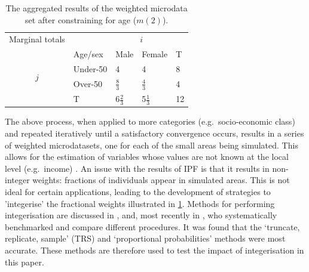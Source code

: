 \documentclass[a4paper,10pt]{article}
\begin{document}
\begin{table}[htbp]
\centering
\caption[Aggregated results after constraining for age]{The
aggregated results of the weighted
microdata set after constraining for age ($m(2)$).
}

\begin{tabular}{cllll}\toprule
Marginal totals&  & \multicolumn{2}{c}{$i$} & \\
& Age/sex & Male & Female & T\\ \midrule
\multirow{2}{*}{$j$} & Under-50 & 4 & 4 & 8\\
& Over-50 & $\frac{8}{3}$ & $\frac{4}{3}$ & 4 \\
& T & $6\frac{2}{3}$ & 5$\frac{1}{3}$ & 12\\
\bottomrule
\end{tabular}
\label{t:m2}
\end{table}

The above process, when applied to more categories (e.g.~socio-economic class)
and repeated iteratively until a satisfactory convergence occurs, results in a
series of weighted microdatasets, one for each of the small areas being
simulated. This allows for the estimation of variables whose values are not
known at the local level (e.g.~income) \citep{Ballas2005c}. An issue
with the results of IPF
is that it results in non-integer weights: fractions of individuals
appear in simulated areas. This is not ideal
for certain applications, leading to the development of strategies
to 'integerise' the fractional weights illustrated in \cref{t:m2}.
Methods for performing integerisation are discussed in
\citep{Ballas2005c}, \citep{Pritchard2012} and, most recently
in \citep{Lovelace2013-trs}, who
systematically benchmarked and compare different procedures.
It was found that the `truncate, replicate, sample' (TRS)
and `proportional probabilities' methods were most accurate.
These methods are therefore used to test the impact of
integerisation in this paper.

\end{document}
